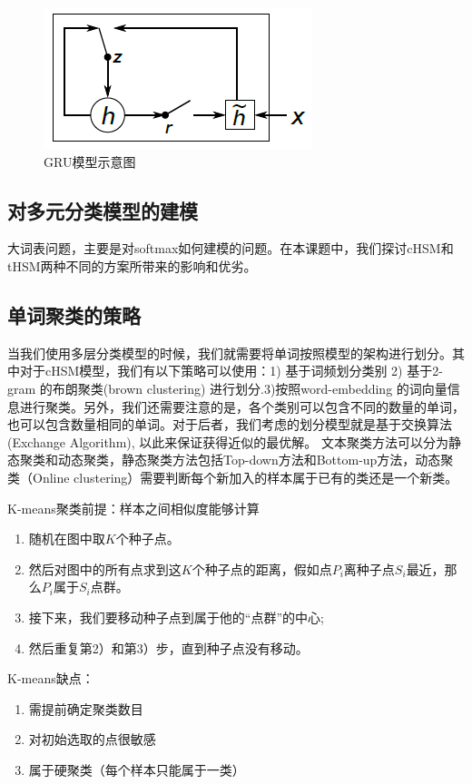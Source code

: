 \documentclass[12pt,a4paper]{article}
\begin{document}
\begin{figure}
  \centering
  \includegraphics[width=0.4\linewidth]{./figures/gru.png}
  \caption{GRU模型示意图}\label{fig:gru}
\end{figure}


\subsection{对多元分类模型的建模}
大词表问题，主要是对softmax如何建模的问题。在本课题中，我们探讨cHSM和tHSM两种不同的方案所带来的影响和优劣。


\subsection{单词聚类的策略}
当我们使用多层分类模型的时候，我们就需要将单词按照模型的架构进行划分。其中对于cHSM模型，我们有以下策略可以使用：1) 基于词频划分类别 2) 基于2-gram 的布朗聚类(brown clustering) 进行划分.3)按照word-embedding 的词向量信息进行聚类。另外，我们还需要注意的是，各个类别可以包含不同的数量的单词，也可以包含数量相同的单词。对于后者，我们考虑的划分模型就是基于交换算法(Exchange Algorithm), 以此来保证获得近似的最优解。 文本聚类方法可以分为静态聚类和动态聚类，静态聚类方法包括Top-down方法和Bottom-up方法，动态聚类（Online clustering）需要判断每个新加入的样本属于已有的类还是一个新类。


K-means聚类前提：样本之间相似度能够计算
\begin{enumerate}
  \item 随机在图中取$K$个种子点。
  \item 然后对图中的所有点求到这$K$个种子点的距离，假如点$P_i$离种子点$S_i$最近，那么$P_i$属于$S_i$点群。
  \item  接下来，我们要移动种子点到属于他的“点群”的中心;
  \item 然后重复第2）和第3）步，直到种子点没有移动。
\end{enumerate}


K-means缺点：
\begin{enumerate}
  \item 需提前确定聚类数目
  \item 对初始选取的点很敏感
  \item 属于硬聚类（每个样本只能属于一类）
\end{enumerate}
\end{document}
